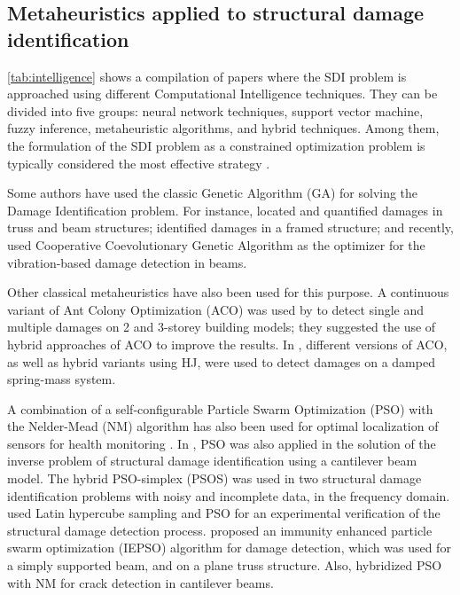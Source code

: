 \subsection{Metaheuristics applied to structural damage identification}

\autoref{tab:intelligence} shows a compilation of papers where the SDI problem is approached using different Computational Intelligence techniques. They can be divided into five groups: neural network techniques, support vector machine, fuzzy inference, metaheuristic algorithms, and hybrid techniques. Among them, the formulation of the SDI problem as a constrained optimization problem is typically considered the most effective strategy \cite{Yu2011}.

Some authors have used the classic Genetic Algorithm (GA) for solving the Damage Identification problem. For instance,  located and quantified damages in truss and beam structures;  identified damages in a framed structure; and recently,  used Cooperative Coevolutionary Genetic Algorithm as the optimizer for the vibration-based damage detection in beams.

Other classical metaheuristics have also been used for this purpose. A continuous variant of Ant Colony Optimization (ACO) was used by  to detect single and multiple damages on 2 and 3-storey building models; they suggested the use of hybrid approaches of ACO to improve the results. In , different versions of ACO, as well as hybrid variants using HJ, were used to detect damages on a damped spring-mass system.

A combination of a self-configurable Particle Swarm Optimization (PSO) with the Nelder-Mead (NM) algorithm has also been used for optimal localization of sensors for health monitoring \cite{rao2007optimal}. In , PSO was also applied in the solution of the inverse problem of structural damage identification using a cantilever beam model. The hybrid PSO-simplex (PSOS) was used in two structural damage identification problems with noisy and incomplete data, in the frequency domain.  used Latin hypercube sampling and PSO for an experimental verification of the structural damage detection process.  proposed an immunity enhanced particle swarm optimization (IEPSO) algorithm for damage detection, which was used for a simply supported beam, and on a plane truss structure. Also,  hybridized PSO with NM for crack detection in cantilever beams.


